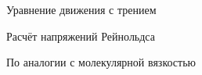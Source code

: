 \begin{chapter}{Уравнение движения с трением}
\begin{section}{Расчёт напряжений Рейнольдса}
\begin{paragraph}{По аналогии с молекулярной вязкостью}
%


\end{paragraph}
\end{section}
\end{chapter}
